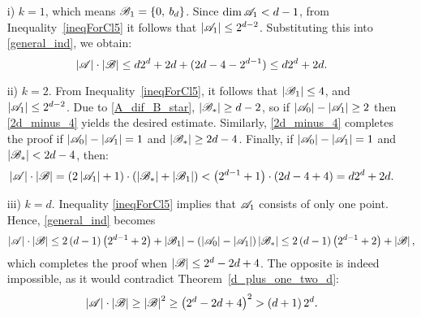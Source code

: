         \begin{enumerate}
            \item[i)] $k=1$, which means ${\mathscr{B}}_1=\{0,\:b_d\}$. Since $\operatorname{dim}{\mathscr{A}}_1<d-1$, from Inequality~\ref{ineqForCl5} it follows that $\left|{\mathscr{A}}_1\right|\leq2^{d-2}$. Substituting this into \eqref{general_ind}, we obtain:
            \begin{equation*}
                |{\mathscr{A}}|\cdot|{\mathscr{B}}|\leq d 2^d + 2d + (2d - 4 - 2^{d-1}) \leq d 2^d + 2d.
            \end{equation*}
            \item[ii)] $k=2$. From Inequality~\ref{ineqForCl5}, it follows that $\left|{\mathscr{B}}_1\right|\leq4$, and $\left|{\mathscr{A}}_1\right|\leq2^{d-2}$. Due to \eqref{A_dif_B_star}, $\left|{\mathscr{B}}_*\right|\geq d-2$, so if $\left|{\mathscr{A}}_0\right|-\left|{\mathscr{A}}_1\right|\geq 2$ then \eqref{2d_minus_4} yields the desired estimate. Similarly, \eqref{2d_minus_4} completes the proof if $\left|{\mathscr{A}}_0\right|-\left|{\mathscr{A}}_1\right|=1$ and $\left|{\mathscr{B}}_*\right|\geq 2d-4$. Finally, if $\left|{\mathscr{A}}_0\right|-\left|{\mathscr{A}}_1\right|=1$ and $\left|{\mathscr{B}}_*\right|<2d-4$, then:
            \begin{equation*}
                \left|{\mathscr{A}}\right|\cdot\left|{\mathscr{B}}\right|=\left(2\left|{\mathscr{A}}_1\right|+1\right)\cdot\left(\left|{\mathscr{B}}_*\right|+\left|{\mathscr{B}}_1\right|\right)<\left(2^{d-1}+1\right)\cdot\left(2d-4+4\right)=d 2^d + 2d.
            \end{equation*}
            \item[iii)] $k=d$. Inequality \ref{ineqForCl5} implies that ${\mathscr{A}}_1$ consists of only one point. Hence, \eqref{general_ind} becomes
            \begin{equation*}
                \left|{\mathscr{A}}\right|\cdot\left|{\mathscr{B}}\right|\leq 2\left(d-1\right)\left(2^{d-1}+2\right)+\left|{\mathscr{B}}_1\right|-\left(\left|{\mathscr{A}}_0\right|-\left|{\mathscr{A}}_1\right|\right)\left|{\mathscr{B}}_*\right| \leq 2\left(d-1\right)\left(2^{d-1}+2\right)+\left|{\mathscr{B}}\right|,
            \end{equation*}
            which completes the proof when $|{\mathscr{B}}| \leq 2^d-2d+4$. The opposite is indeed impossible, as it would contradict Theorem~\ref{d_plus_one_two_d}:
            \begin{equation*}
                \left|{\mathscr{A}}\right|\cdot\left|{\mathscr{B}}\right|\geq\left|{\mathscr{B}}\right|^2\geq\left(2^d-2d+4\right)^2>\left(d+1\right)2^d.
            \end{equation*}
        \end{enumerate}

